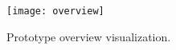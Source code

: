 \begin{figure}[ht]
  \texttt{[image: overview]}
  \caption[Overview]{Prototype overview visualization.}
  \label{fig:overview}
  \centering
\end{figure}